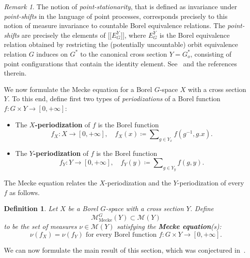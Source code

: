 \documentclass{amsart}
\numberwithin{equation}{subsection}
\newtheorem{defn}[thm]{Definition}
\theoremstyle{remark}
\newtheorem{rem}[thm]{Remark}
\begin{document}
\begin{rem}
The notion of \emph{point-stationarity}, that is defined as invariance under \emph{point-shifts} in the language of point processes, corresponds precisely to this notion of measure invariance to countable Borel equivalence relations. The \emph{point-shifts} are precisely the elements of \(\bigl[\!\bigl[E_{G}^{Y}\bigr]\!\bigr]\), where \(E_{G}^{Y}\) is the Borel equivalence relation obtained by restricting the (potentially uncountable) orbit equivalence relation \(G\) induces on \(G^{\ast}\) to the canonical cross section \(Y = G_{o}^{\ast}\), consisting of point configurations that contain the identity element. See~\cite[\S3.1]{heveling2005} and the references therein.
\end{rem}

We now formulate the Mecke equation for a Borel \(G\)-space \(X\) with a cross section \(Y\). To this end, define first two types of \emph{periodizations} of a Borel function \(f:G\times Y\to\left[0,+\infty\right]\):
\begin{itemize}
    \item The \(X\){\bf-periodization} of \(f\) is the Borel function
    \[f_{X}:X\longrightarrow\left[0,+\infty\right],\quad f_{X}\left(x\right)\coloneqq\sum\nolimits_{g\in Y_{x}}f\left(g^{-1},g.x\right).\]
    \item The \(Y\){\bf-periodization} of \(f\) is the Borel function
    \[f_{Y}:Y\longrightarrow\left[0,+\infty\right],\quad f_{Y}\left(y\right)\coloneqq \sum\nolimits_{g\in Y_{y}}f\left(g,y\right).\]
\end{itemize}

The Mecke equation relates the \(X\)-periodization and the \(Y\)-periodization of every \(f\) as follows.

\begin{defn}
Let \(X\) be a Borel \(G\)-space with a cross section \(Y\). Define
\[\mathcal{M}_{\mathrm{Mecke}}^{G}\left(Y\right)\subset\mathcal{M}\left(Y\right)\]
to be the set of measures \(\nu\in\mathcal{M}\left(Y\right)\) satisfying the {\bf Mecke equation}(s):
\begin{equation}\label{eq:mecke}
\nu\left(f_{X}\right)=\nu\left(f_{Y}\right)\text{ for every Borel function }f:G\times Y\to\left[0,+\infty\right].
\end{equation}
\end{defn}

We can now formulate the main result of this section, which was conjectured in~\cite[\S3.10]{last2009}.
\end{document}
